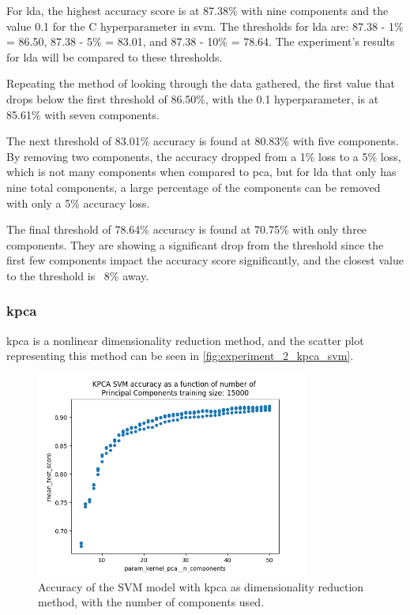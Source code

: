 For \gls{lda}, the highest accuracy score is at 87.38\% with nine components and the value 0.1 for the C hyperparameter in \gls{svm}. The thresholds for \gls{lda} are: 87.38 - 1\% = 86.50, 87.38 - 5\% = 83.01, and 87.38 - 10\% = 78.64. The experiment's results for \gls{lda} will be compared to these thresholds.

Repeating the method of looking through the data gathered, the first value that drops below the first threshold  of 86.50\%, with the 0.1 hyperparameter, is at 85.61\% with seven components.

The next threshold of 83.01\% accuracy is found at 80.83\% with five components. By removing two components, the accuracy dropped from a 1\% loss to a 5\% loss, which is not many components when compared to \gls{pca}, but for \gls{lda} that only has nine total components, a large percentage of the components can be removed with only a 5\% accuracy loss.

The final threshold of 78.64\% accuracy is found at 70.75\% with only three components. They are showing a significant drop from the threshold since the first few components impact the accuracy score significantly, and the closest value to the threshold is ~8\% away.


\subsubsection{\gls{kpca}}\label{subsubsec:experiment_2_kpca}
\gls{kpca} is a nonlinear dimensionality reduction method, and the scatter plot representing this method can be seen in \autoref{fig:experiment_2_kpca_svm}.

\begin{figure}[htb!]
    \centering
    \includegraphics[width=0.8\textwidth]{figures/experiment_two/kpca_svm_15000.png}
    \caption{Accuracy of the SVM model with \gls{kpca} as dimensionality reduction method, with the number of components used.}
    \label{fig:experiment_2_kpca_svm}
\end{figure}

